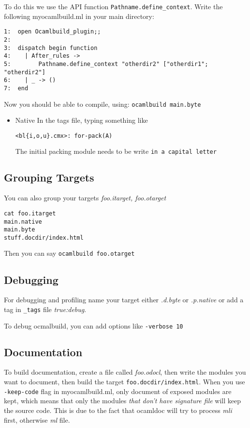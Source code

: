 \documentclass[11pt]{article}
\begin{document}
   To do this we use the API function \texttt{Pathname.define\_context}. Write
   the following myocamlbuild.ml in your main directory:


\begin{verbatim}
1:  open Ocamlbuild_plugin;;
2:  
3:  dispatch begin function
4:    | After_rules ->
5:        Pathname.define_context "otherdir2" ["otherdir1"; "otherdir2"]
6:    | _ -> ()
7:  end
\end{verbatim}
   Now you should be able to compile, using:
   \texttt{ocamlbuild main.byte}

\begin{itemize}
\item Native
     In the tags file, typing something like

\begin{verbatim}
<bl{i,o,u}.cmx>: for-pack(A)
\end{verbatim}
     The initial packing module needs to be write \texttt{in a capital letter}
\end{itemize}
     
\subsection*{Grouping Targets}
\label{sec-1-5}

   You can also  group your targets \emph{foo.itarget, foo.otarget}


\begin{verbatim}
cat foo.itarget
main.native
main.byte 
stuff.docdir/index.html
\end{verbatim}
   Then you can say \texttt{ocamlbuild foo.otarget}
\subsection*{Debugging}
\label{sec-1-6}


   For debugging and profiling name your target either \emph{.d.byte}
   or \emph{.p.native} or add a tag in \texttt{\_tags} file \emph{true:debug}.


   To debug ocmalbuild, you can add options like \texttt{-verbose 10}
\subsection*{Documentation}
\label{sec-1-7}


   To build documentation, create a file called \emph{foo.odocl}, then
   write the modules you want to document, then build the target
   \texttt{foo.docdir/index.html}. When you use \texttt{-keep-code} flag in
   myocamlbuild.ml, only document of exposed modules are kept, which
   means that only the modules \emph{that don't have signature file} will
   keep the source code. This is due to the fact that ocamldoc will
   try to process \emph{mli} first, otherwise \emph{ml} file.
\end{document}
